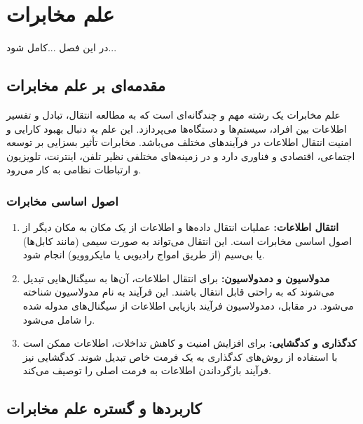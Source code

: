 \chapter{علم مخابرات}
در این فصل ...کامل شود...
\section{مقدمه‌ای بر علم مخابرات}
علم مخابرات یک رشته مهم و چندگانه‌ای است که به مطالعه انتقال، تبادل و تفسیر اطلاعات بین افراد، سیستم‌ها و دستگاه‌ها می‌پردازد. این علم به دنبال بهبود کارایی و امنیت انتقال اطلاعات در فرآیندهای مختلف می‌باشد. مخابرات تأثیر بسزایی بر توسعه اجتماعی، اقتصادی و فناوری دارد و در زمینه‌های مختلفی نظیر تلفن، اینترنت، تلویزیون و ارتباطات نظامی به کار می‌رود.

\subsection{
	اصول اساسی مخابرات
}
\begin{enumerate}
	\item \textbf{
		انتقال اطلاعات:
	}
	 عملیات انتقال داده‌ها و اطلاعات از یک مکان به مکان دیگر از اصول اساسی مخابرات است. این انتقال می‌تواند به صورت سیمی (مانند کابل‌ها) یا بی‌سیم (از طریق امواج رادیویی یا مایکروویو) انجام شود.
	
	\item \textbf{مدولاسیون و دمدولاسیون:} برای انتقال اطلاعات، آن‌ها به سیگنال‌هایی تبدیل می‌شوند که به راحتی قابل انتقال باشند. این فرآیند به نام مدولاسیون شناخته می‌شود. در مقابل، دمدولاسیون فرآیند بازیابی اطلاعات از سیگنال‌های مدوله شده را شامل می‌شود.
	
	\item \textbf{کدگذاری و کدگشایی:} برای افزایش امنیت و کاهش تداخلات، اطلاعات ممکن است با استفاده از روش‌های کدگذاری به یک فرمت خاص تبدیل شوند. کدگشایی نیز فرآیند بازگرداندن اطلاعات به فرمت اصلی را توصیف می‌کند.
\end{enumerate}

\section{کاربردها و گستره علم مخابرات}

